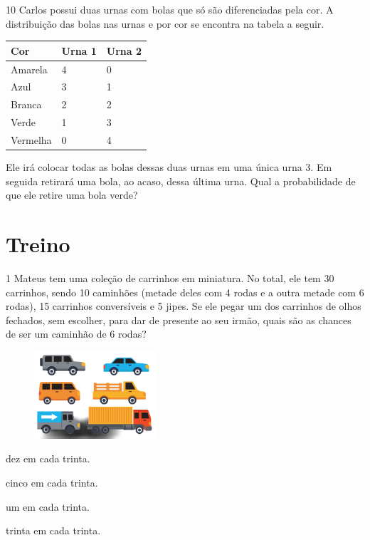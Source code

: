 \num{10} Carlos possui duas urnas com bolas que só são diferenciadas pela cor. A
distribuição das bolas nas urnas e por cor se encontra na tabela a
seguir.

\begin{longtable}[]{@{}lll@{}}
\toprule
\hline
\textbf{Cor} & \textbf{Urna 1} & \textbf{Urna 2}\tabularnewline
\hline
\midrule
\endhead
Amarela & 4 & 0\tabularnewline
\hline
Azul & 3 & 1\tabularnewline
\hline
Branca & 2 & 2\tabularnewline
\hline
Verde & 1 & 3\tabularnewline
\hline
Vermelha & 0 & 4\tabularnewline
\hline
\bottomrule
\end{longtable}


Ele irá colocar todas as bolas dessas duas urnas em uma única urna 3. Em
seguida retirará uma bola, ao acaso, dessa última urna. Qual a
probabilidade de que ele retire uma bola verde?

\pagebreak
\section*{Treino}

\num{1} Mateus tem uma coleção de carrinhos em miniatura. No total, ele tem 30 carrinhos, sendo 10 caminhões (metade deles com 4 rodas e a outra metade com 6 rodas), 15 carrinhos conversíveis e 5 jipes. Se ele pegar um dos carrinhos de olhos fechados, sem escolher, para dar de presente ao seu irmão, quais são as chances de ser um caminhão de 6 rodas?

\begin{figure}[htpb!]
\centering
\includegraphics[width=0.4\textwidth]{./media/image75f.png}
\end{figure}

\begin{escolha}
\begin{multicols}{2}
\item
  dez em cada trinta.
\item
  cinco em cada trinta.
\item
  um em cada trinta.
\item
  trinta em cada trinta.
\end{multicols}
\end{escolha}


